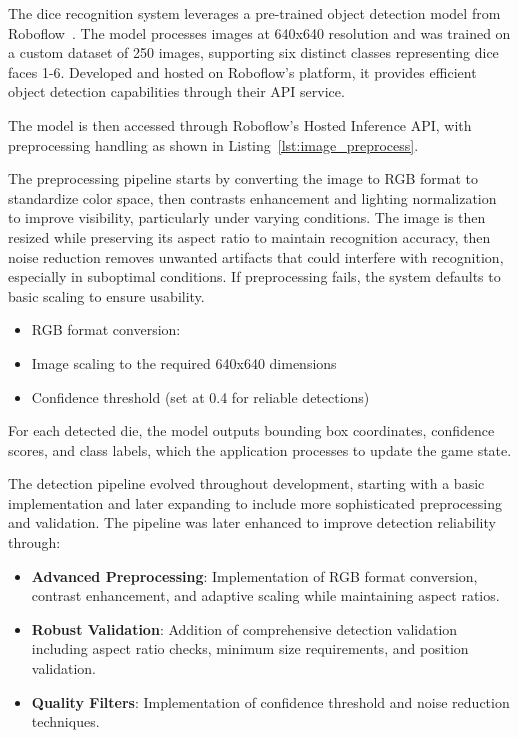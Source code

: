 The dice recognition system leverages a pre-trained object detection model from Roboflow~\cite{bib:kavidataset}. The model processes images at 640x640 resolution and was trained on a custom dataset of 250 images, supporting six distinct classes representing dice faces 1-6. Developed and hosted on Roboflow's platform, it provides efficient object detection capabilities through their API service.

The model is then accessed through Roboflow's Hosted Inference API, with preprocessing handling as shown in Listing~\ref{lst:image_preprocess}.

The preprocessing pipeline starts by converting the image to RGB format to standardize color space, then contrasts enhancement and lighting normalization to improve visibility, particularly under varying conditions. The image is then resized while preserving its aspect ratio to maintain recognition accuracy, then noise reduction removes unwanted artifacts that could interfere with recognition, especially in suboptimal conditions. If preprocessing fails, the system defaults to basic scaling to ensure usability.

\begin{itemize}
    \item RGB format conversion: 
    \item Image scaling to the required 640x640 dimensions
    \item Confidence threshold (set at 0.4 for reliable detections)
\end{itemize} 

For each detected die, the model outputs bounding box coordinates, confidence scores, and class labels, which the application processes to update the game state.

The detection pipeline evolved throughout development, starting with a basic implementation and later expanding to include more sophisticated preprocessing and validation.
The pipeline was later enhanced to improve detection reliability through:
\begin{itemize}
    \item \textbf{Advanced Preprocessing}: Implementation of RGB format conversion, contrast enhancement, and adaptive scaling while maintaining aspect ratios.
    \item \textbf{Robust Validation}: Addition of comprehensive detection validation including aspect ratio checks, minimum size requirements, and position validation.
    \item \textbf{Quality Filters}: Implementation of confidence threshold and noise reduction techniques.
\end{itemize}

